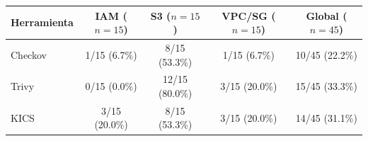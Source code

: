 \begin{tabular}{lcccc}
\toprule
Herramienta & IAM ($n=15$) & S3 ($n=15$) & VPC/SG ($n=15$) & Global ($n=45$) \\
\midrule
Checkov & 1/15 (6.7\%) & 8/15 (53.3\%) & 1/15 (6.7\%) & 10/45 (22.2\%) \\
Trivy & 0/15 (0.0\%) & 12/15 (80.0\%) & 3/15 (20.0\%) & 15/45 (33.3\%) \\
KICS & 3/15 (20.0\%) & 8/15 (53.3\%) & 3/15 (20.0\%) & 14/45 (31.1\%) \\
\bottomrule
\end{tabular}
